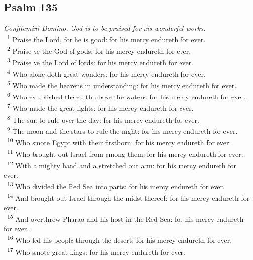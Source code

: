 \documentclass[a5paper,12pt]{article}
\begin{document}
\begin{multicols*}{2}
\section{Psalm 135}
\label{sec:org7c5f81a}
\emph{Confitemini Domino. God is to be praised for his wonderful works.}\\

~\textsuperscript{1} Praise the Lord, for he is good: for his mercy endureth for ever.\\
~\textsuperscript{2} Praise ye the God of gods: for his mercy endureth for ever.\\
~\textsuperscript{3} Praise ye the Lord of lords: for his mercy endureth for ever.\\
~\textsuperscript{4} Who alone doth great wonders: for his mercy endureth for ever.\\
~\textsuperscript{5} Who made the heavens in understanding: for his mercy endureth for ever.\\
~\textsuperscript{6} Who established the earth above the waters: for his mercy endureth for ever.\\
~\textsuperscript{7} Who made the great lights: for his mercy endureth for ever.\\
~\textsuperscript{8} The sun to rule over the day: for his mercy endureth for ever.\\
~\textsuperscript{9} The moon and the stars to rule the night: for his mercy endureth for ever.\\
~\textsuperscript{10} Who smote Egypt with their firstborn: for his mercy endureth for ever.\\
~\textsuperscript{11} Who brought out Israel from among them: for his mercy endureth for ever.\\
~\textsuperscript{12} With a mighty hand and a stretched out arm: for his mercy endureth for ever.\\
~\textsuperscript{13} Who divided the Red Sea into parts: for his mercy endureth for ever.\\
~\textsuperscript{14} And brought out Israel through the midst thereof: for his mercy endureth for ever.\\
~\textsuperscript{15} And overthrew Pharao and his host in the Red Sea: for his mercy endureth for ever.\\
~\textsuperscript{16} Who led his people through the desert: for his mercy endureth for ever.\\
~\textsuperscript{17} Who smote great kings: for his mercy endureth for ever.\\

\end{multicols*}
\end{document}
